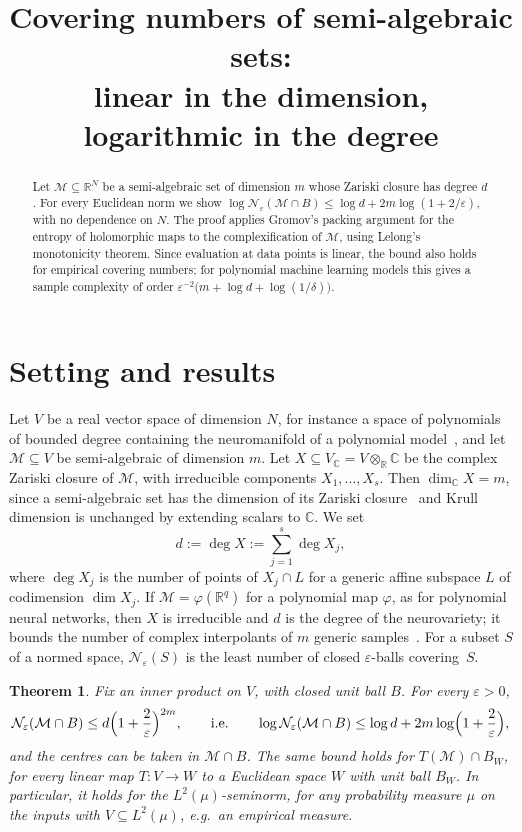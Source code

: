 \documentclass[11pt]{article}
\title{Covering numbers of semi-algebraic sets:\\
linear in the dimension, logarithmic in the degree}
\author{}
\date{}
\newtheorem{theorem}{Theorem}
\newcommand{\R}{\mathbb{R}}
\newcommand{\C}{\mathbb{C}}
\newcommand{\cM}{\mathcal{M}}
\newcommand{\cN}{\mathcal{N}}
\begin{document}
\maketitle

\begin{abstract}
Let $\cM\subseteq\R^N$ be a semi-algebraic set of dimension $m$ whose Zariski
closure has degree $d$. For every Euclidean norm we show
$\log\cN_\varepsilon(\cM\cap B)\le\log d+2m\log(1+2/\varepsilon)$, with no
dependence on $N$. The proof applies Gromov's packing argument for the entropy
of holomorphic maps to the complexification of $\cM$, using Lelong's
monotonicity theorem. Since evaluation at data points is linear, the bound also
holds for empirical covering numbers; for polynomial machine learning models
this gives a sample complexity of order
$\varepsilon^{-2}\bigl(m+\log d+\log(1/\delta)\bigr)$.
\end{abstract}

\section{Setting and results}

Let $V$ be a real vector space of dimension $N$, for instance a space of
polynomials of bounded degree containing the neuromanifold of a polynomial
model~\cite{MSMTK25}, and let $\cM\subseteq V$ be semi-algebraic of dimension
$m$. Let $X\subseteq V_\C=V\otimes_\R\C$ be the complex Zariski closure of
$\cM$, with irreducible components $X_1,\dots,X_s$. Then $\dim_\C X=m$, since
a semi-algebraic set has the dimension of its Zariski
closure~\cite[\S2.8]{BCR98} and Krull dimension is unchanged by extending
scalars to $\C$. We set
\[
  d:=\deg X:=\sum_{j=1}^{s}\deg X_j,
\]
where $\deg X_j$ is the number of points of $X_j\cap L$ for a generic affine
subspace $L$ of codimension $\dim X_j$. If $\cM=\varphi(\R^q)$ for a polynomial
map $\varphi$, as for polynomial neural networks, then $X$ is irreducible and
$d$ is the degree of the neurovariety; it bounds the number of complex
interpolants of $m$ generic samples~\cite[App.~B]{MSMTK25}. For a subset $S$ of
a normed space, $\cN_\varepsilon(S)$ is the least number of closed
$\varepsilon$-balls covering~$S$.

\begin{theorem}\label{thm:main}
Fix an inner product on $V$, with closed unit ball $B$. For every
$\varepsilon>0$,
\[
  \cN_\varepsilon(\cM\cap B)\le d\Bigl(1+\frac{2}{\varepsilon}\Bigr)^{2m},
  \qquad\text{i.e.}\qquad
  \log\cN_\varepsilon(\cM\cap B)\le\log d+2m\log\Bigl(1+\frac{2}{\varepsilon}\Bigr),
\]
and the centres can be taken in $\cM\cap B$. The same bound holds for
$T(\cM)\cap B_W$, for every linear map $T\colon V\to W$ to a Euclidean space $W$
with unit ball $B_W$. In particular, it holds for the $L^2(\mu)$-seminorm, for
any probability measure $\mu$ on the inputs with $V\subseteq L^2(\mu)$, e.g.\ an
empirical measure.
\end{theorem}
\end{document}
